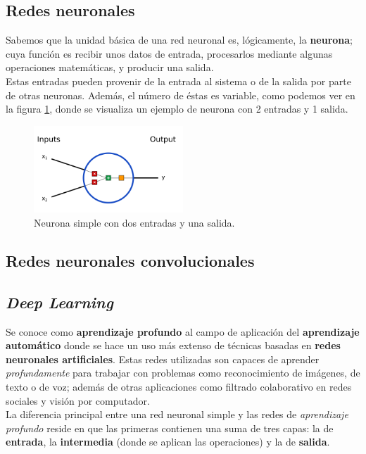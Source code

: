 \documentclass[]{scrartcl}
\begin{document}
	\subsection{Redes neuronales}
	
		Sabemos que la unidad básica de una red neuronal es, lógicamente, la \textbf{neurona}; cuya función es recibir unos datos de entrada, procesarlos mediante algunas operaciones matemáticas, y producir una salida.\\
		
		Estas entradas pueden provenir de la entrada al sistema o de la salida por parte de otras neuronas. Además, el número de éstas es variable, como podemos ver en la figura \ref{neuron}, donde se visualiza un ejemplo de neurona con 2 entradas y 1 salida.
	
		\begin{figure}[h]
			\centering
			\includegraphics[width=0.5\textwidth]{./img/neuron}
			\caption{Neurona simple con dos entradas y una salida.}
			\label{neuron}
		\end{figure}
	
	\subsection{Redes neuronales convolucionales}
	
	\subsection{\textit{Deep Learning}}
	
		Se conoce como \textbf{aprendizaje profundo} al campo de aplicación del \textbf{aprendizaje automático} donde se hace un uso más extenso de técnicas basadas en \textbf{redes neuronales artificiales}. Estas redes utilizadas son capaces de aprender \textit{profundamente} para trabajar con problemas como reconocimiento de imágenes, de texto o de voz; además de otras aplicaciones como filtrado colaborativo en redes sociales y visión por computador.\\
		
		La diferencia principal entre una red neuronal simple y las redes de \textit{aprendizaje profundo} reside en que las primeras contienen una suma de tres capas: la de \textbf{entrada}, la \textbf{intermedia} (donde se aplican las operaciones) y la de \textbf{salida}.\\
		
\end{document}
